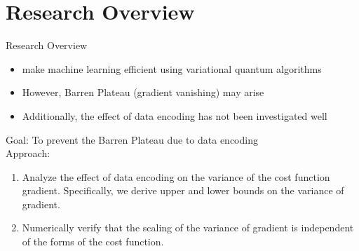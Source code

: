 \documentclass[dvipdfmx,10pt,aspectratio=169]{beamer}
\begin{document}
\section{Research Overview}
\begin{frame}{Research Overview}
    \begin{center}
        {\large\colorbox{blue!40}{}}
    \end{center}
    \begin{center}
        \begin{minipage}{0.9\textwidth}
            \begin{itemize}
                \item make machine learning efficient using variational quantum algorithms
                \item However, Barren Plateau (gradient vanishing) may arise
                \item Additionally, the effect of data encoding has not been investigated well
            \end{itemize}
        \end{minipage}
    \end{center}

    \begin{center}
        {\large\colorbox{blue!40}{}}
    \end{center}

    Goal: To prevent the Barren Plateau due to data encoding\\
    
    Approach: 
    \begin{center}
        \begin{minipage}{1\textwidth}
            \begin{enumerate}
                \item Analyze the effect of data encoding on the variance of the cost function gradient. Specifically, we derive upper and lower bounds on the variance of gradient.
                \item Numerically verify that the scaling of the variance of gradient is independent of the forms of the cost function.
            \end{enumerate}
        \end{minipage}
    \end{center}
\end{frame}
\end{document}
